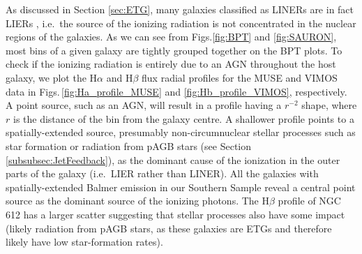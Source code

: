 		As discussed in Section \ref{sec:ETG}, many galaxies classified as LINERs are in fact LIERs \citep[see e.g.][]{Sarzi2005, Sarzi2010, Singh2013, Belfiore2016}, i.e.\ the source of the ionizing radiation is not concentrated in the nuclear regions of the galaxies. As we can see from Figs.\ref{fig:BPT} and \ref{fig:SAURON}, most bins of a given galaxy are tightly grouped together on the BPT plots. To check if the ionizing radiation is entirely due to an AGN throughout the host galaxy, we plot the H$\alpha$ and H$\beta$ flux radial profiles for the MUSE and VIMOS data in Figs.\,\ref{fig:Ha_profile_MUSE} and \ref{fig:Hb_profile_VIMOS}, respectively. A point source, such as an AGN, will result in a profile having a $r^{-2}$ shape, where $r$ is the distance of the bin from the galaxy centre. A shallower profile points to a spatially-extended source, presumably non-circumnuclear stellar processes such as star formation or radiation from pAGB stars (see Section \ref{subsubsec:JetFeedback}), as the dominant cause of the ionization in the outer parts of the galaxy (i.e.\ LIER rather than LINER). All the galaxies with spatially-extended Balmer emission in our Southern Sample reveal a central point source as the dominant source of the ionizing photons. The H$\beta$ profile of NGC 612 has a larger scatter suggesting that stellar processes also have some impact (likely radiation from pAGB stars, as these galaxies are ETGs and therefore likely have low star-formation rates).

		


